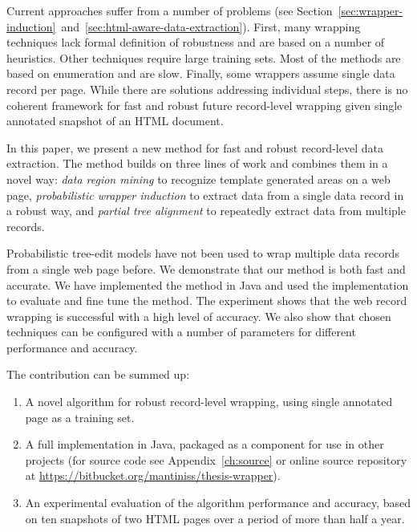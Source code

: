 
Current approaches suffer from a number of problems (see Section~\ref{sec:wrapper-induction}~and~\ref{sec:html-aware-data-extraction}). First, many wrapping techniques lack formal definition of robustness and are based on a number of heuristics. Other techniques require large training sets. Most of the methods are based on enumeration and are slow. Finally, some wrappers assume single data record per page. While there are solutions addressing individual steps, there is no coherent framework for fast and robust future record-level wrapping given single annotated snapshot of an HTML document.

In this paper, we present a new method for fast and robust record-level data extraction. The method builds on three lines of work and combines them in a novel way: \emph{data region mining} \cite{liu2009a} to recognize template generated areas on a web page, \emph{probabilistic wrapper induction} \cite{DBLP:journals/pvldb/ParameswaranDGR11} to extract data from a single data record in a robust way, and \emph{partial tree alignment} \cite{zhai2005a} to repeatedly extract data from multiple records. 

Probabilistic tree-edit models have not been used to wrap multiple data records from a single web page before. We demonstrate that our method is both fast and accurate. We have implemented the method in Java and used the implementation to evaluate and fine tune the method. The experiment shows that the web record wrapping is successful with a high level of accuracy. We also show that chosen techniques can be configured with a number of parameters for different performance and accuracy.

The contribution can be summed up:

\begin{enumerate}
	\item A novel algorithm for robust record-level wrapping, using single annotated page as a training set.
	\item A full implementation in Java, packaged as a component for use in other projects (for source code see Appendix~\ref{ch:source} or online source repository at \url{https://bitbucket.org/mantiniss/thesis-wrapper}).
	\item An experimental evaluation of the algorithm performance and accuracy, based on ten snapshots of two HTML pages over a period of more than half a year.
\end{enumerate}

